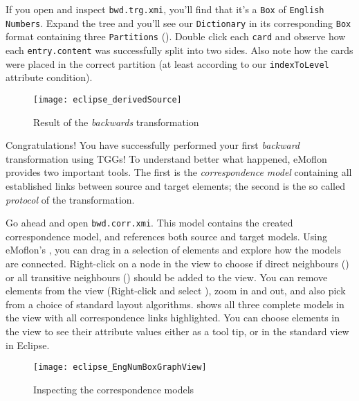 \begin{stepbystep}
\item If you open and inspect \texttt{bwd.trg.xmi}, you'll find that it's a \texttt{Box} of \texttt{English Numbers}.
Expand the tree and you'll see our \texttt{Dictionary} in its corresponding
\texttt{Box} format containing three \texttt{Par\-ti\-tions} (). 
Double click each \texttt{card} and observe how each \texttt{entry.content} was successfully split into two sides.
Also note how the cards were placed in the correct partition (at least according to our \texttt{indexToLevel} attribute condition).

\begin{figure}[htbp]
\begin{center}
  \texttt{[image: eclipse\_derivedSource]}
  \caption{Result of the \emph{backwards} transformation}
  \label{eclipse:derivedBOX}
\end{center}
\end{figure}

\item
Congratulations!
You have successfully performed your first \emph{backward} transformation using TGGs!
To understand better what happened, eMoflon provides two important tools.
The first is the \emph{correspondence model} containing all established links between source and target elements;
the second is the so called \emph{protocol} of the transformation. 

\item Go ahead and open \texttt{bwd.corr.xmi}.
This model contains the created correspondence model, and references both source and target models.
Using eMoflon's , you can drag in a selection of elements and explore how the models are connected.
Right-click on a node in the view to choose if direct neighbours () or all transitive neighbours (\menuPath{\lstinline|-(*)->|}) should be added to the view.
You can remove elements from the view (Right-click and select ), zoom in and out, and also pick from a choice of standard layout algorithms.
 shows all three complete models in the view with all correspondence links highlighted. 
You can choose elements in the view to see their attribute values either as a tool tip, or in the standard  view in Eclipse.

\begin{figure}[htb]
\begin{center}
  \texttt{[image: eclipse\_EngNumBoxGraphView]}
  \caption{Inspecting the correspondence models}
  \label{eclipse:graphView}
\end{center}
\end{figure}


\end{stepbystep}
